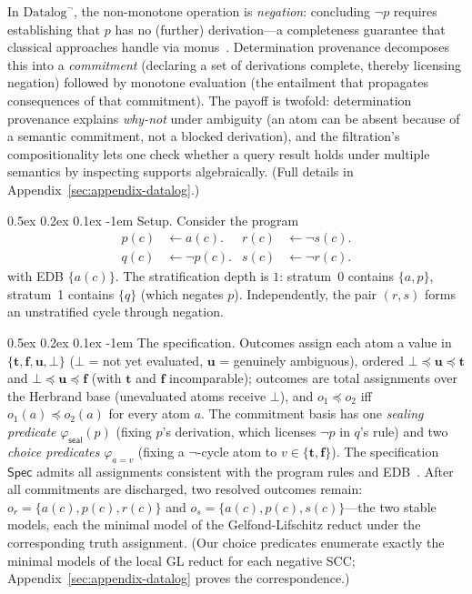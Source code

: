 \documentclass[acmsmall,review,anonymous]{acmart}
\makeatletter
\renewcommand{\paragraph}{\@startsection{paragraph}{4}{\z@}%
  {0.5ex \@plus 0.2ex \@minus 0.1ex}%
  {-1em}%
  {\normalfont\normalsize\bfseries}}
\newcommand{\Spec}{\mathsf{Spec}}
\newcommand{\seal}{\mathsf{seal}}
\newcommand{\Ord}{\preceq}
\theoremstyle{remark}
\numberwithin{definition}{section}
\numberwithin{theorem}{section}
\numberwithin{lemma}{section}
\numberwithin{corollary}{section}
\numberwithin{remark}{section}
\numberwithin{example}{section}
\numberwithin{observation}{section}
\numberwithin{assumption}{section}
\makeatother
\begin{document}
In $\mbox{Datalog}^\neg$, the non-monotone operation is
\emph{negation}: concluding $\neg p$ requires establishing that
$p$ has no (further) derivation---a completeness guarantee
that classical approaches handle via monus~\cite{dannert2021semiring}.
Determination provenance decomposes this into a \emph{commitment}
(declaring a set of derivations complete, thereby licensing negation)
followed by monotone evaluation (the entailment that propagates
consequences of that commitment).
The payoff is twofold: determination provenance explains \emph{why-not}
under ambiguity (an atom can be absent because of a semantic
commitment, not a blocked derivation), and the filtration's
compositionality lets one check whether a query result holds under
multiple semantics by inspecting supports algebraically.
(Full details in Appendix~\ref{sec:appendix-datalog}.)

\paragraph{Setup.}
Consider the program
\begin{align*}
  p(c) & \leftarrow a(c).      & r(c) & \leftarrow \neg s(c). \\
  q(c) & \leftarrow \neg p(c). & s(c) & \leftarrow \neg r(c).
\end{align*}
with EDB $\{a(c)\}$.
The stratification depth is $1$: stratum~0 contains $\{a, p\}$, 
stratum~1 contains $\{q\}$ (which negates $p$).
Independently, the pair $(r, s)$ forms an unstratified cycle through negation.

\paragraph{The specification.}
Outcomes assign each atom a value in
$\{\mathbf{t}, \mathbf{f}, \mathbf{u}, \bot\}$
($\bot$ = not yet evaluated, $\mathbf{u}$ = genuinely ambiguous),
ordered $\bot \Ord \mathbf{u} \Ord \mathbf{t}$ and
$\bot \Ord \mathbf{u} \Ord \mathbf{f}$
(with $\mathbf{t}$ and $\mathbf{f}$ incomparable); outcomes are total
assignments over the Herbrand base (unevaluated atoms receive $\bot$),
and $o_1 \Ord o_2$ iff $o_1(a) \Ord o_2(a)$ for every atom $a$.
The commitment basis has one \emph{sealing predicate}
$\varphi_{\seal}(p)$ (fixing $p$'s derivation, which
licenses $\neg p$ in $q$'s rule) and two \emph{choice predicates}
$\varphi_{a=v}$ (fixing a $\neg$-cycle atom to
$v \in \{\mathbf{t}, \mathbf{f}\}$).
The specification $\Spec$ admits all assignments consistent with the
program rules and EDB~\cite{gelfond1988stable}.
After all commitments are discharged, two resolved outcomes remain:
$o_r = \{a(c), p(c), r(c)\}$ and $o_s = \{a(c), p(c), s(c)\}$---the
two stable models, each the minimal model of the Gelfond-Lifschitz
reduct under the corresponding truth assignment.
(Our choice predicates enumerate exactly the minimal models of the
local GL reduct for each negative SCC;
Appendix~\ref{sec:appendix-datalog} proves the correspondence.)
\end{document}

